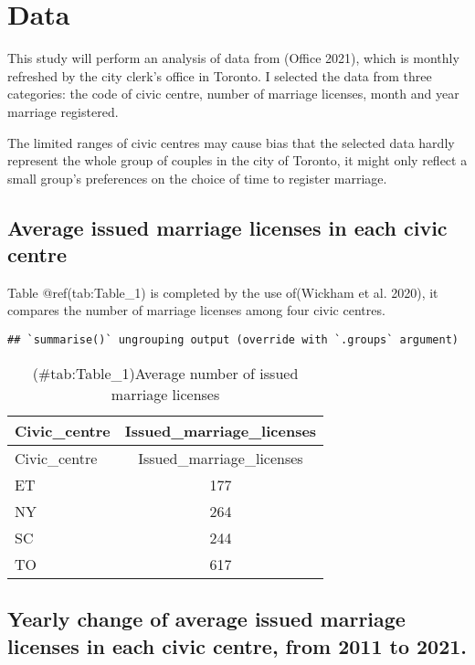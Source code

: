 \documentclass[
]{article}
\begin{document}
\hypertarget{data}{%
\section{Data}\label{data}}

This study will perform an analysis of data from (Office 2021), which is monthly refreshed by the city clerk's office in Toronto. I selected the data from three categories: the code of civic centre, number of marriage licenses, month and year marriage registered.

The limited ranges of civic centres may cause bias that the selected data hardly represent the whole group of couples in the city of Toronto, it might only reflect a small group's preferences on the choice of time to register marriage.

\hypertarget{average-issued-marriage-licenses-in-each-civic-centre}{%
\subsection{Average issued marriage licenses in each civic centre}\label{average-issued-marriage-licenses-in-each-civic-centre}}

Table @ref(tab:Table\_1) is completed by the use of(Wickham et al. 2020), it compares the number of marriage licenses among four civic centres.

\begin{verbatim}
## `summarise()` ungrouping output (override with `.groups` argument)
\end{verbatim}

\begin{longtable}[]{@{}lc@{}}
\caption{(\#tab:Table\_1)Average number of issued marriage licenses}\tabularnewline
\toprule
Civic\_centre & Issued\_marriage\_licenses\tabularnewline
\midrule
\endfirsthead
\toprule
Civic\_centre & Issued\_marriage\_licenses\tabularnewline
\midrule
\endhead
ET & 177\tabularnewline
NY & 264\tabularnewline
SC & 244\tabularnewline
TO & 617\tabularnewline
\bottomrule
\end{longtable}

\hypertarget{yearly-change-of-average-issued-marriage-licenses-in-each-civic-centre-from-2011-to-2021.}{%
\subsection{Yearly change of average issued marriage licenses in each civic centre, from 2011 to 2021.}\label{yearly-change-of-average-issued-marriage-licenses-in-each-civic-centre-from-2011-to-2021.}}
\end{document}
